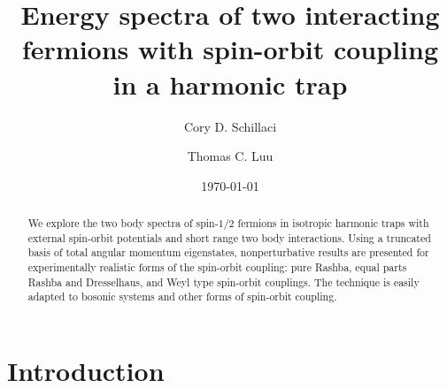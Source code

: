 \documentclass[%
 preprint,
 amsmath,amssymb,
 aps,
]{revtex4-1}
\begin{document}

\title{Energy spectra of two interacting fermions with spin-orbit coupling in a harmonic trap}%

\author{Cory D. Schillaci}
%

\author{Thomas C. Luu}%

\date{\today}%

\begin{abstract}
We explore the two body spectra of spin-$1/2$ fermions in isotropic harmonic traps with external spin-orbit potentials and short range two body interactions. Using a truncated basis of total angular momentum eigenstates, nonperturbative results are presented for experimentally realistic forms of the spin-orbit coupling: pure Rashba, equal parts Rashba and Dresselhaus, and Weyl type spin-orbit couplings. The technique is easily adapted to bosonic systems and other forms of spin-orbit coupling.
\end{abstract}

\maketitle


\section{\label{sec:level1}Introduction}
\end{document}
